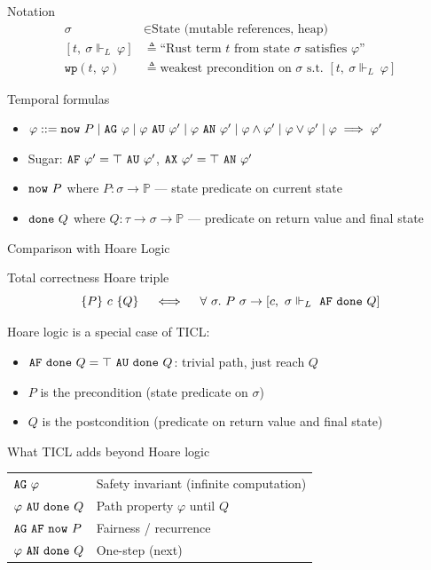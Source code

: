 \documentclass[aspectratio=169]{beamer}
\newcommand{\ventailsL}[3]{\ensuremath{[#1, \ #2 \Vdash_L ~#3 ]}}
\newcommand{\wpx}[2]{\ensuremath{\mathtt{wp}(#1,~#2)}}
\begin{document}
\begin{frame}{Notation}
  \begin{align*}
    \sigma &\in \text{State (mutable references, heap)} \\
    \ventailsL{t}{\sigma}{\varphi} &\triangleq \text{``Rust term } t \text{ from state } \sigma \text{ satisfies } \varphi\text{''} \\
    \wpx{t}{\varphi} &\triangleq \text{weakest precondition on } \sigma \text{ s.t.\ } \ventailsL{t}{\sigma}{\varphi}
  \end{align*}

  \begin{block}{Temporal formulas}
    \begin{itemize}
      \item $\varphi ::= \now{P} \mid \AG{\varphi} \mid \AU{\varphi}{\varphi'} \mid \AN{\varphi}{\varphi'} \mid \varphi \land \varphi' \mid \varphi \lor \varphi' \mid \varphi \implies \varphi'$
      \item Sugar: $\AF{\varphi'} = \AU{\top}{\varphi'}$, \quad $\AX{\varphi'} = \AN{\top}{\varphi'}$
      \item $\now{P}$ where $P : \sigma \to \mathbb{P}$ --- state predicate on current state
      \item $\done{Q}$ where $Q : \tau \to \sigma \to \mathbb{P}$ --- predicate on return value and final state
    \end{itemize}
  \end{block}
\end{frame}

\begin{frame}{Comparison with Hoare Logic}
  \begin{block}{Total correctness Hoare triple}
    $$\{P\}~c~\{Q\} \quad\iff\quad \forall~\sigma.~ P~\sigma \to \ventailsL{c}{\sigma}{\AF{\done{Q}}}$$
  \end{block}

  Hoare logic is a special case of TICL:
  \begin{itemize}
    \item $\AF{\done{Q}} = \AU{\top}{\done{Q}}$: trivial path, just reach $Q$
    \item $P$ is the precondition (state predicate on $\sigma$)
    \item $Q$ is the postcondition (predicate on return value and final state)
  \end{itemize}

  \vspace{0.3cm}
  \begin{block}{What TICL adds beyond Hoare logic}
    \begin{tabular}{l l}
      $\AG{\varphi}$ & Safety invariant (infinite computation) \\
      $\AU{\varphi}{\done{Q}}$ & Path property $\varphi$ until $Q$ \\
      $\AG{\AF{\now{P}}}$ & Fairness / recurrence \\
      $\AN{\varphi}{\done{Q}}$ & One-step (next) \\
    \end{tabular}
  \end{block}
\end{frame}
\end{document}
